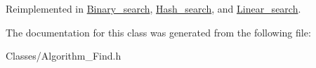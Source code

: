 Reimplemented in \hyperlink{class_binary__search_a3fcd818239f47c062d03fc17962fdee6}{Binary\-\_\-search}, \hyperlink{class_hash__search_aca6c6feb173e26bf7d1aa574e3c9316c}{Hash\-\_\-search}, and \hyperlink{class_linear__search_a7c4f47cfdc8482d04fb162cf2316a466}{Linear\-\_\-search}.



The documentation for this class was generated from the following file\-:\begin{DoxyCompactItemize}
\item 
Classes/Algorithm\-\_\-\-Find.\-h\end{DoxyCompactItemize}
